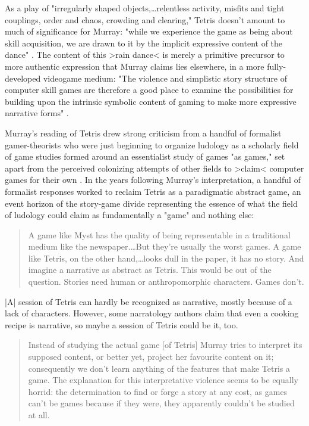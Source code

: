 As a play of "irregularly shaped objects,…relentless activity, misfits and tight couplings, order and chaos, crowding and clearing," Tetris doesn't amount to much of significance for Murray: "while we experience the game as being about skill acquisition, we are drawn to it by the implicit expressive content of the dance" \autocite[144]{Murray1997}. The content of this >rain dance< is merely a primitive precursor to more authentic expression that Murray claims lies elsewhere, in a more fully-developed videogame medium: "The violence and simplistic story structure of computer skill games are therefore a good place to examine the possibilities for building upon the intrinsic symbolic content of gaming to make more expressive narrative forms" \autocite[144-5]{Murray1997}.

Murray's reading of Tetris drew strong criticism from a handful of formalist gamer-theorists who were just beginning to organize ludology as a scholarly field of game studies formed around an essentialist study of games "as games," set apart from the perceived colonizing attempts of other fields to >claim< computer games for their own \autocite{Aarseth2001-y1}. In the years following Murray's interpretation, a handful of formalist responses worked to reclaim Tetris as a paradigmatic abstract game, an event horizon of the story-game divide representing the essence of what the field of ludology could claim as fundamentally a "game" and nothing else:

\blockquote{
  A game like Myst has the quality of being representable in a traditional medium like the newspaper.…But they're usually the worst games. A game like Tetris, on the other hand,…looks dull in the paper, it has no story. And imagine a narrative as abstract as Tetris. This would be out of the question. Stories need human or anthropomorphic characters. Games don't. \autocite{Juul1998}
  }
  
\begin{quoting}
    |A| session of Tetris can hardly be recognized as narrative, mostly because of a lack of characters. However, some narratology authors claim that even a cooking recipe is narrative, so maybe a session of Tetris could be it, too. \autocite{Frasca1999}
\end{quoting}
\blockquote{
  Instead of studying the actual game [of Tetris] Murray tries to interpret its supposed content, or better yet, project her favourite content on it; consequently we don't learn anything of the features that make Tetris a game. The explanation for this interpretative violence seems to be equally horrid: the determination to find or forge a story at any cost, as games can't be games because if they were, they apparently couldn't be studied at all. \autocite{Eskelinen2001}
  }
  
